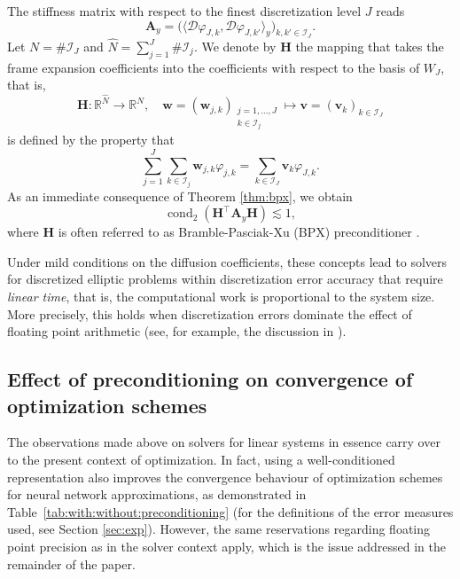 \documentclass[a4paper,11pt]{amsart}
\numberwithin{equation}{section}
\theoremstyle{definition}
\theoremstyle{remark}
\theoremstyle{plain}
\newcommand{\R}{\mathbb{R}}
\begin{document}
The stiffness matrix with respect to the finest discretization level $J$ reads
\begin{equation}
 \mathbf A_y = \bigl( \langle \mathcal D \varphi_{J,k},  \mathcal D \varphi_{J, k'} \rangle_{y} \bigr)_{k,k' \in \mathcal I_J}. 
\end{equation}
Let  $N = \# \mathcal I_J$ and $\hat N = \sum_{j=1}^J \# \mathcal I_j$. We  denote
by $\mathbf H$ the mapping
 that takes the frame expansion coefficients into the coefficients with respect to the basis of $W_J$, that is, 
\begin{equation}
   \mathbf H \colon \R^{\hat N} \to \R^{N}, \quad \mathbf w = (\mathbf w_{j, k} )_{\substack{j=1,\ldots,J\\ k \in \mathcal I_j}}  \mapsto \mathbf v = (\mathbf v_{k})_{k \in \mathcal I_J}
\end{equation}
is defined by the property that
\[
    \sum_{j=1}^J \sum_{k \in \mathcal I_j} \mathbf w_{j,k} \varphi_{j,k} = \sum_{k \in \mathcal I_J} \mathbf v_k \varphi_{J,k}.
\]
As an immediate consequence of Theorem \ref{thm:bpx}, we obtain
%
\begin{equation}
\label{AS}
   \operatorname{cond}_2 (\mathbf H^\intercal \mathbf A_y \mathbf H ) \lesssim 1, 
\end{equation}
where $\mathbf H$ is often referred to as Bramble-Pasciak-Xu (BPX) preconditioner \cite{MR1023042,BPX}.

Under mild conditions on the diffusion coefficients, these  concepts lead to solvers for discretized elliptic problems within discretization error accuracy that require {\em linear time}, that is, the computational work is proportional to the system size. More precisely, this holds when discretization errors dominate the effect of floating point arithmetic (see, for example, the discussion in 
\cite{MR4839137}). 

\subsection{Effect of preconditioning on convergence of optimization schemes}
The observations made above on solvers for linear systems in essence carry over to the present context of
optimization.
In fact, using a well-conditioned representation also improves the convergence behaviour of optimization schemes for neural network approximations, as demonstrated in Table~\ref{tab:with:without:preconditioning} (for the definitions of the error measures used, see Section \ref{sec:exp}). However, the same reservations regarding floating point precision as in the solver context apply, which is the issue addressed in the remainder
of the paper. 
%
\end{document}
